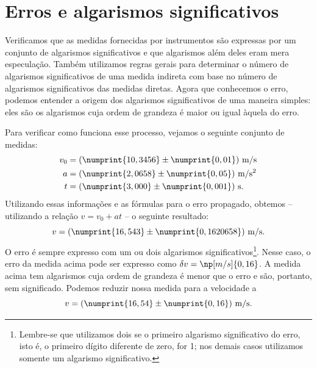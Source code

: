 \section{Erros e algarismos significativos}

Verificamos que as medidas fornecidas por instrumentos são expressas por um conjunto de algarismos significativos e que algarismos além deles eram mera especulação. Também utilizamos regras gerais para determinar o número de algarismos significativos de uma medida indireta com base no número de algarismos significativos das medidas diretas. Agora que conhecemos o erro, podemos entender a origem dos algarismos significativos de uma maneira simples: eles são os algarismos cuja ordem de grandeza é maior ou igual àquela do erro. %

Para verificar como funciona esse processo, vejamos o seguinte conjunto de medidas:
\begin{align}
	v_0 &= (\numprint{10,3456} \pm \numprint{0,01})~\textrm{m}/\textrm{s} \label{medidas_v_start}\\
	a &= (\numprint{2,0658} \pm \numprint{0,05})~\textrm{m}/\textrm{s}^2 \\
	t &= (\numprint{3,000} \pm \numprint{0,001})~\textrm{s} \label{medidas_v_end}.
\end{align}
%
Utilizando essas informações e as fórmulas para o erro propagado, obtemos -- utilizando a relação $v = v_0 + at$ -- o seguinte resultado:
\begin{equation}
	v = (\numprint{16,543} \pm \numprint{0,1620658})~\textrm{m}/\textrm{s}.
\end{equation}
%
O erro é sempre expresso com um ou dois algarismos significativos\footnote{Lembre-se que utilizamos dois se o primeiro algarismo significativo do erro, isto é, o primeiro dígito diferente de zero, for 1; nos demais casos utilizamos somente um algarismo significativo.}. Nesse caso, o erro da medida acima pode ser expresso como $\delta v = \np[m/s]{0,16}$. A medida acima tem algarismos cuja ordem de grandeza é menor que o erro e são, portanto, sem significado. Podemos reduzir nossa medida para a velocidade a
\begin{equation}\label{ResultadoAlgSigErro}
	v = (\numprint{16,54} \pm \numprint{0,16})~\textrm{m}/\textrm{s}.
\end{equation}

